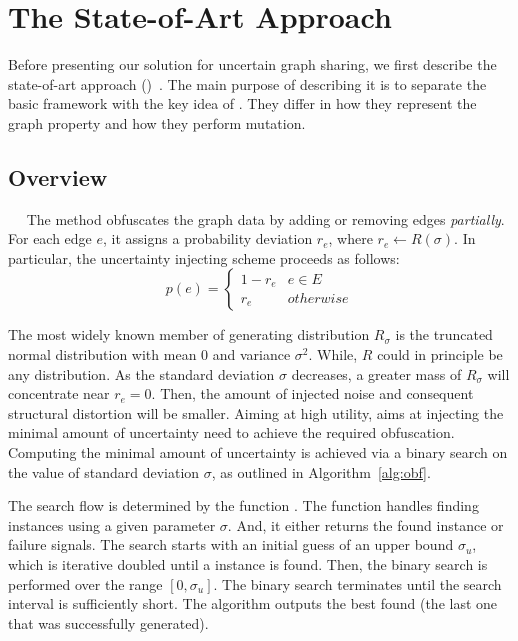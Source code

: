 \section{The State-of-Art Approach}
Before presenting our solution {\methodName} for uncertain graph sharing, we first describe the state-of-art approach ({\soaName})~\cite{Boldi_Injecting_2012}. 
The main purpose of describing it is to separate the basic framework with the key idea of {\methodName}. 
They differ in how they represent the graph property and how they perform mutation. 

\subsection{Overview}~~
The {\soaName} method obfuscates the graph data by adding or removing edges \emph{partially}. 
For each edge $e$, it assigns a probability deviation $r_{e}$, where $r_{e} \leftarrow R(\sigma)$. 
In particular, the uncertainty injecting scheme proceeds as follows:
\begin{equation}
	p(e) =
	\begin{cases}
		 1-r_{e}  & e \in E \\
		 r_{e}    & otherwise 
	\end{cases}
	\label{eq:inject}
\end{equation}

The most widely known member of generating distribution $R_{\sigma}$ is the truncated normal distribution with mean 0 and variance $\sigma^2$. 
While, $R$ could in principle be any distribution. 
As the standard deviation $\sigma$ decreases, a greater mass of $R_{\sigma}$ will concentrate near $r_{e}=0$.  
Then, the amount of injected noise and consequent structural distortion will be smaller. 
Aiming at high utility, {\soaName} aims at injecting the minimal amount of uncertainty need to achieve the required obfuscation. 
Computing the minimal amount of uncertainty is achieved via a binary search on the value of standard deviation $\sigma$, as outlined in Algorithm~\ref{alg:obf}. 


The search flow is determined by the function {\genobf}. The function {\genobf} handles finding {\keobf} instances using a given parameter $\sigma$. And, it either returns the found {\keobf} instance or failure signals.
The search starts with an initial guess of an upper bound $\sigma_{u}$, which is iterative doubled until a {\keobf} instance is found. Then, the binary search is performed over the range $[0,\sigma_{u}]$. The binary search terminates until the search interval is sufficiently short. The algorithm outputs the best {\keobf} found (the last one that was successfully generated).


